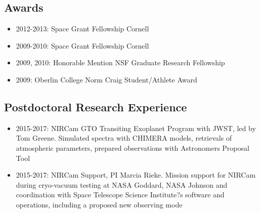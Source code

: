 \documentclass[11pt, oneside]{article}   	%
\begin{document}
\begingroup
\renewcommand{\section}[2]{}%


\endgroup

%
%

\vspace{-0.15in}
\subsection*{Awards}
\begin{itemize}[noitemsep]
        \item 2012-2013: Space Grant Fellowship Cornell
        \item 2009-2010: Space Grant Fellowship Cornell
        \item 2009, 2010: Honorable Mention NSF Graduate Research Fellowship 
        \item 2009: Oberlin College Norm Craig Student/Athlete Award
\end{itemize}

\subsection*{Postdoctoral Research Experience}
\begin{itemize}[noitemsep]
	\item 2015-2017: NIRCam GTO Transiting Exoplanet Program with JWST, led by Tom Greene. Simulated spectra with CHIMERA models, retrievals of atmospheric parameters, prepared observations with Astronomers Proposal Tool
	\item 2015-2017: NIRCam Support, PI Marcia Rieke. Mission support for NIRCam during cryo-vacuum testing at NASA Goddard, NASA Johnson and coordination with Space Telescope Science Institute?s software and operations, including a proposed new observing mode
\end{itemize}
\end{document}
